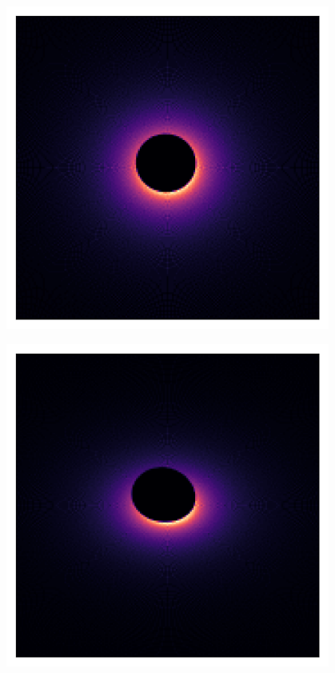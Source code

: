 \documentclass{beamer}
\begin{document}
\begin{frame}{}
    \centering

    \includegraphics[width=0.8\textwidth]{asset/bh_0.95_20.png}

\end{frame}


\begin{frame}{}
    \centering

    \includegraphics[width=0.8\textwidth]{asset/bh_0.95_45.png}

\end{frame}
\end{document}

